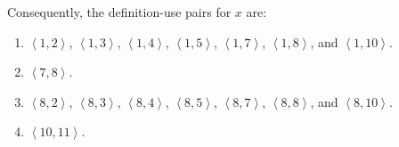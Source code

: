 \begin{example}
    Consequently, the definition-use pairs for $x$ are:
    \begin{enumerate}
        \item $\left\langle 1,2 \right\rangle$, $\left\langle 1,3 \right\rangle$, $\left\langle 1,4 \right\rangle$, $\left\langle 1,5 \right\rangle$, $\left\langle 1,7 \right\rangle$, $\left\langle 1,8 \right\rangle$, and $\left\langle 1,10 \right\rangle$.
        \item $\left\langle 7,8 \right\rangle$.
        \item $\left\langle 8,2 \right\rangle$, $\left\langle 8,3 \right\rangle$, $\left\langle 8,4 \right\rangle$, $\left\langle 8,5 \right\rangle$, $\left\langle 8,7 \right\rangle$, $\left\langle 8,8 \right\rangle$, and $\left\langle 8,10 \right\rangle$.
        \item $\left\langle 10,11 \right\rangle$.
    \end{enumerate}
\end{example}

